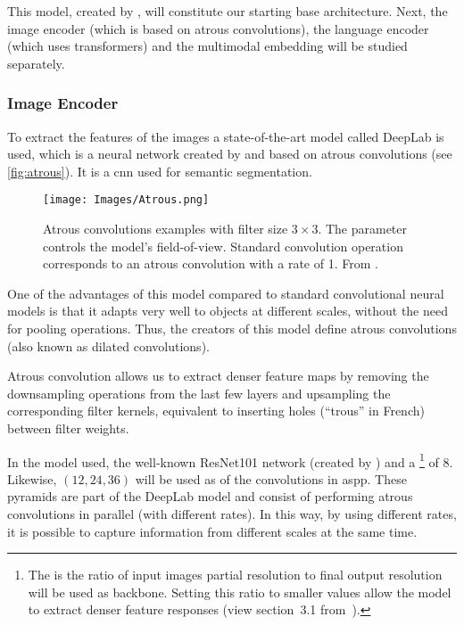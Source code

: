 This model, created by , will constitute our starting
base architecture. Next, the image encoder (which is based on atrous
convolutions), the language encoder (which uses transformers) and the
multimodal embedding will be studied separately.

\subsubsection{Image Encoder}

To extract the features of the images a state-of-the-art model called DeepLab
is used, which is a neural network created by  and based
on atrous convolutions (see \vref{fig:atrous}). It is a \gls{cnn} used for
semantic segmentation.

\begin{figure}[ht]
  \centering
  \texttt{[image: Images/Atrous.png]}
  \caption[Atrous convolutions examples]{Atrous convolutions examples with
    filter size \(3 \times 3\). The  parameter controls the model's
    field-of-view. Standard convolution operation corresponds to an atrous
    convolution with a rate of 1. From .}%
  \label{fig:atrous}
\end{figure}

One of the advantages of this model compared to standard convolutional neural
models is that it adapts very well to objects at different scales, without the
need for pooling operations. Thus, the creators of this model define atrous
convolutions (also known as dilated convolutions).

\begin{quoteBox}
  Atrous convolution allows us to extract denser feature maps by removing the
  downsampling operations from the last few layers and upsampling the
  corresponding filter kernels, equivalent to inserting holes (``trous'' in
  French) between filter weights.
  \tcblower{}
\end{quoteBox}

In the model used, the well-known ResNet101 network (created by
) and a \footnote{The
   is the ratio of input images partial resolution to
  final output resolution will be used as backbone. Setting this ratio to
  smaller values allow the model to extract denser feature responses (view
  section~3.1 from~\cite{chen17:rethin}).} of 8. Likewise, \((12, 24, 36)\)
will be used as  of the convolutions in \gls{aspp}. These pyramids
are part of the DeepLab model and consist of performing atrous convolutions in
parallel (with different rates). In this way, by using different rates, it is
possible to capture information from different scales at the same time.

